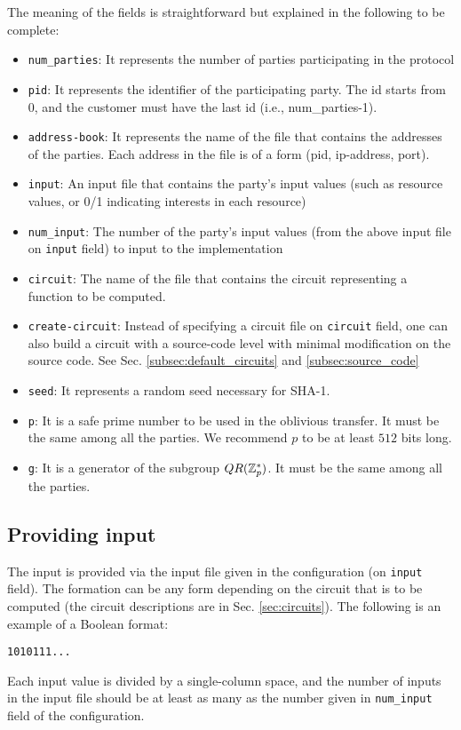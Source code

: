 \documentclass{article}
\begin{document}
The meaning of the fields is straightforward but explained in the
following to be complete:
\begin{itemize}
\item
{\tt num\_parties}:
It represents the number of parties participating in the protocol
\item
{\tt pid}:
It represents the identifier of the participating party. The id starts
from $0$, and the customer must have the last id (i.e.,
num\_parties-1).
\item
{\tt address-book}:
It represents the name of the file that contains the addresses of the
parties. Each address in the file is of a form (pid, ip-address,
port).
\item
{\tt input}:
An input file that contains the party's input values (such as resource
values, or 0/1 indicating interests in each resource)
\item
{\tt num\_input}:
The number of the party's input values (from the above input file on
{\tt input} field) to input to the implementation
\item
{\tt circuit}:
The name of the file that contains the circuit representing a function 
to be computed.
\item
{\tt create-circuit}: Instead of specifying a circuit file on {\tt circuit} field,
one can also build a circuit with a source-code level with minimal modification 
on the source code. See Sec. \ref{subsec:default_circuits} and \ref{subsec:source_code}
\item
{\tt seed}:
It represents a random seed necessary for SHA-1.
\item
{\tt p}:
It is a safe prime number to be used in the oblivious transfer. It must be the
same among all the parties. We recommend $p$ to be at least $512$ bits
long.
\item
{\tt g}:
It is a generator of the subgroup $QR({\mathbb Z}_p^*)$. It must be the same
among all the parties.
\end{itemize}


\subsection{Providing input}
The input is provided via the input file given in the configuration (on {\tt input} field).
The formation can be any form depending on the circuit that is to
be computed (the circuit descriptions are in Sec. \ref{sec:circuits}).
The following is an example of a Boolean format:
%
\begin{alltt}
\small
1 0 1 0 1 1 1 ...
\end{alltt}
%
Each input value is divided by a single-column space, and the number
of inputs in the input file should be at least as many as the number
given in {\tt num\_input} field of the configuration.
\end{document}
